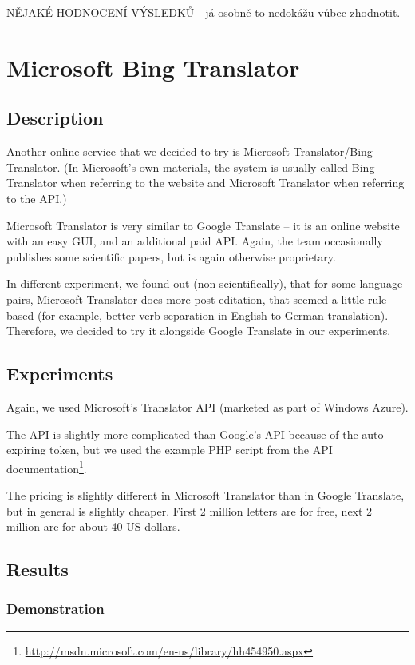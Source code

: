 NĚJAKÉ HODNOCENÍ VÝSLEDKŮ - já osobně to nedokážu vůbec zhodnotit.

\section{Microsoft Bing Translator}
\subsection{Description}
Another online service that we decided to try is Microsoft Translator/Bing Translator. (In Microsoft's own materials, the system is usually called Bing Translator when referring to the website and Microsoft Translator when referring to the API.)

Microsoft Translator is very similar to Google Translate -- it is an online website with an easy GUI, and an additional paid API. Again, the team occasionally publishes some scientific papers, but is again otherwise proprietary.

In different experiment, we found out (non-scientifically), that for some language pairs, Microsoft Translator does more post-editation, that seemed a little rule-based (for example, better verb separation in English-to-German translation). Therefore, we decided to try it alongside Google Translate in our experiments.


\subsection{Experiments}
Again, we used Microsoft's Translator API (marketed as part of Windows Azure).

The API is slightly more complicated than Google's API because of the auto-expiring token, but we used the example PHP script from the API documentation\footnote{\url{http://msdn.microsoft.com/en-us/library/hh454950.aspx}}.

The pricing is slightly different in Microsoft Translator than in Google Translate, but in general is slightly cheaper. First 2 million letters are for free, next 2 million are for about 40 US dollars.

\subsection{Results}
\subsubsection{Demonstration}

